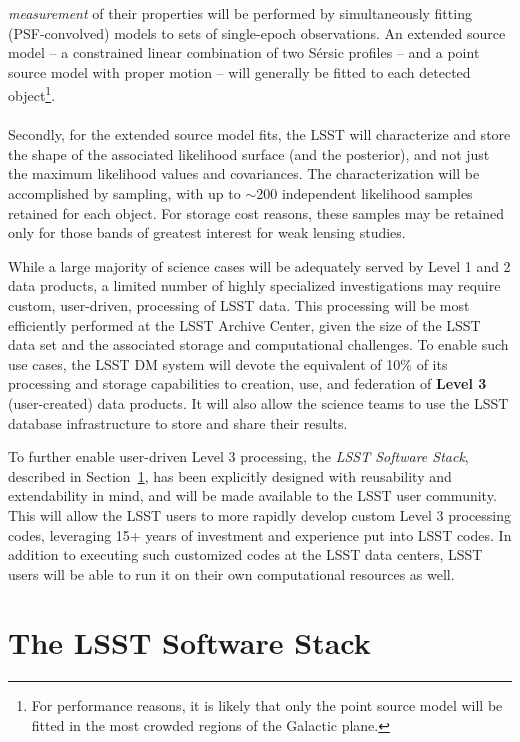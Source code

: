 \documentclass[11pt,twoside]{article}
\begin{document}
\begin{itemize}
{\em measurement} of their properties will be performed by
simultaneously fitting (PSF-convolved) models to sets of single-epoch
observations. An extended source model -- a constrained linear
combination of two S\'ersic profiles -- and a point source model with
proper motion -- will generally be
fitted to each detected object\footnote{For performance reasons, it is
  likely that only the point source model will be fitted in the most
  crowded regions of the Galactic plane.}.\\
\\
Secondly, for the extended source model fits, the LSST will
characterize and store the shape of the associated likelihood surface
(and the posterior), and not just the maximum likelihood values and
covariances. The characterization will be accomplished by sampling,
with up to $\sim$200 independent likelihood samples retained for
each object. For storage cost reasons, these samples
may be retained only for those bands of greatest interest for
weak lensing studies.

\end{itemize}


While a large majority of science cases will be adequately served by
Level 1 and 2 data products, a limited number of highly specialized
investigations may require custom, user-driven, processing of LSST
data. This processing will be most efficiently performed at the
LSST Archive Center, given the size of the LSST data set and the
associated storage and computational challenges. To enable such use
cases, the LSST DM system will devote the equivalent of 10\% of its
processing and storage capabilities to creation, use, and federation
of {\bf Level 3} (user-created) data products. It will also allow the
science teams to use the LSST database infrastructure to store and
share their results.

To further enable user-driven Level 3 processing, the {\em LSST Software
Stack}, described in Section~\ref{sec:dmstack}, has been explicitly
designed with reusability and extendability in mind, and will be made
available to the LSST user community. This will allow the LSST users to
more rapidly develop custom Level 3 processing codes, leveraging 15+
years of investment and experience put into LSST codes. In addition to
executing such customized codes at the LSST data centers, LSST users
will be able to run it on their own computational resources as well.\\



\section{The LSST Software Stack}
\label{sec:dmstack}
\end{document}
